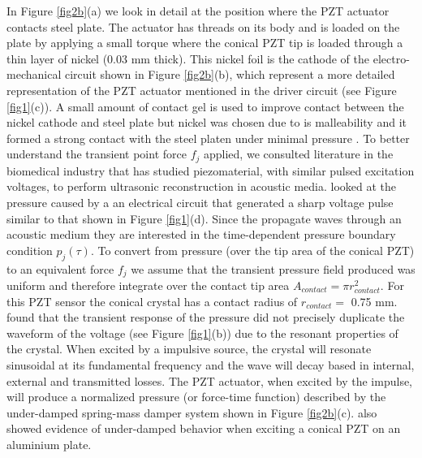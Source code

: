 \documentclass[preprint,3p, 11pt,authoryear]{elsarticle}
\begin{document}
In Figure \ref{fig2b}(a) we look in detail at the position where the PZT actuator contacts steel plate. The actuator has threads on its body and is loaded on the plate by applying a small torque where the conical PZT tip is loaded through a thin layer of nickel (0.03 mm thick). This nickel foil is the cathode of the electro-mechanical circuit shown in Figure \ref{fig2b}(b), which represent a more detailed representation of the PZT actuator mentioned in the driver circuit (see Figure \ref{fig1}(c)). A small amount of contact gel is used to improve contact between the nickel cathode and steel plate but nickel was chosen due to is malleability and it formed a strong contact with the steel platen under minimal pressure \citep{Glaser1998}. To better understand the transient point force $f_{j}$ applied, we consulted literature in the biomedical industry that has studied piezomaterial, with similar pulsed excitation voltages, to perform ultrasonic reconstruction in acoustic media.  \citet{Christensen1988} looked at the pressure caused by a an electrical circuit that generated a sharp voltage pulse similar to that shown in Figure \ref{fig1}(d). Since the propagate waves through an acoustic medium they are interested in the time-dependent pressure boundary condition $p_{j}(\tau)$. To convert from pressure (over the tip area of the conical PZT) to an equivalent force $f_{j}$ we assume that the transient pressure field produced was uniform and therefore integrate over the contact tip area $A_{contact} = \pi r_{contact}^{2}$. For this PZT sensor the conical crystal has a contact radius of $r_{contact} = $ 0.75 mm. \cite{Christensen1988} found that the transient response of the pressure did not precisely duplicate the waveform of the voltage (see Figure \ref{fig1}(b)) due to the resonant properties of the crystal. When excited by a impulsive source, the crystal will resonate sinusoidal at its fundamental frequency and the wave will decay based in internal, external and transmitted losses.  The PZT actuator, when excited by the impulse, will produce a normalized pressure (or force-time function) described by the under-damped spring-mass damper system shown in Figure \ref{fig2b}(c). \citet{Breckenridge1990} also showed evidence of under-damped behavior when exciting a conical PZT on an aluminium plate.
\end{document}
